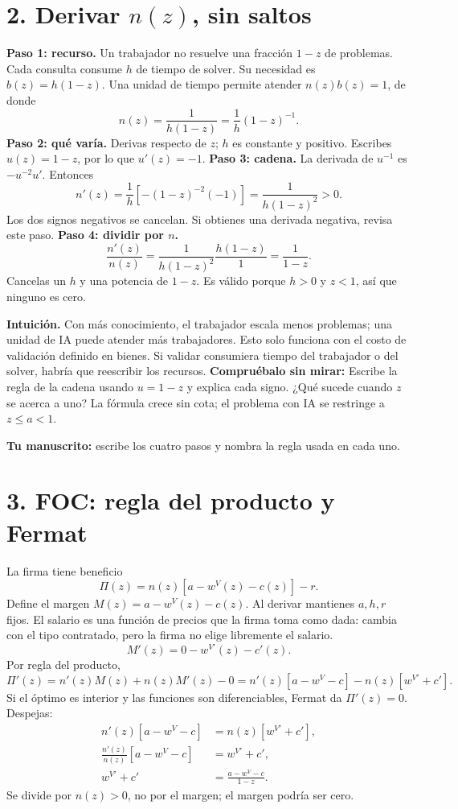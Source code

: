 \documentclass[11pt]{article}
\newcommand{\pregunta}[1]{\medskip\textbf{Compruébalo sin mirar:} #1\par}
\begin{document}
\section*{2. Derivar $n(z)$, sin saltos}
\textbf{Paso 1: recurso.} Un trabajador no resuelve una fracción $1-z$ de problemas. Cada consulta consume $h$ de tiempo de solver. Su necesidad es $b(z)=h(1-z)$. Una unidad de tiempo permite atender $n(z)b(z)=1$, de donde
\[
n(z)=\frac1{h(1-z)}=\frac1h(1-z)^{-1}.
\]
\textbf{Paso 2: qué varía.} Derivas respecto de $z$; $h$ es constante y positivo. Escribes $u(z)=1-z$, por lo que $u'(z)=-1$.
\textbf{Paso 3: cadena.} La derivada de $u^{-1}$ es $-u^{-2}u'$. Entonces
\[
n'(z)=\frac1h[-(1-z)^{-2}(-1)]
=\frac1{h(1-z)^2}>0.
\]
Los dos signos negativos se cancelan. Si obtienes una derivada negativa, revisa este paso.
\textbf{Paso 4: dividir por $n$.}
\[
\frac{n'(z)}{n(z)}=
\frac{1}{h(1-z)^2}\frac{h(1-z)}1
=\frac1{1-z}.
\]
Cancelas un $h$ y una potencia de $1-z$. Es válido porque $h>0$ y $z<1$, así que ninguno es cero.

\textbf{Intuición.} Con más conocimiento, el trabajador escala menos problemas; una unidad de IA puede atender más trabajadores. Esto solo funciona con el costo de validación definido en bienes. Si validar consumiera tiempo del trabajador o del solver, habría que reescribir los recursos.
\pregunta{Escribe la regla de la cadena usando $u=1-z$ y explica cada signo. ¿Qué sucede cuando $z$ se acerca a uno? La fórmula crece sin cota; el problema con IA se restringe a $z\leq a<1$.}
\vfill\textbf{Tu manuscrito:} escribe los cuatro pasos y nombra la regla usada en cada uno.
\newpage
\section*{3. FOC: regla del producto y Fermat}
La firma tiene beneficio
\[
\Pi(z)=n(z)[a-w^V(z)-c(z)]-r.
\]
Define el margen $M(z)=a-w^V(z)-c(z)$. Al derivar mantienes $a,h,r$ fijos. El salario es una función de precios que la firma toma como dada: cambia con el tipo contratado, pero la firma no elige libremente el salario.
\[
M'(z)=0-w^{V\prime}(z)-c'(z).
\]
Por regla del producto,
\[
\Pi'(z)=n'(z)M(z)+n(z)M'(z)-0
=n'(z)[a-w^V-c]-n(z)[w^{V\prime}+c'].
\]
Si el óptimo es interior y las funciones son diferenciables, Fermat da $\Pi'(z)=0$. Despejas:
\begin{align*}
n'(z)[a-w^V-c]&=n(z)[w^{V\prime}+c'],\\
\frac{n'(z)}{n(z)}[a-w^V-c]&=w^{V\prime}+c',\\
w^{V\prime}+c'&=\frac{a-w^V-c}{1-z}.
\end{align*}
Se divide por $n(z)>0$, no por el margen; el margen podría ser cero.
\end{document}
